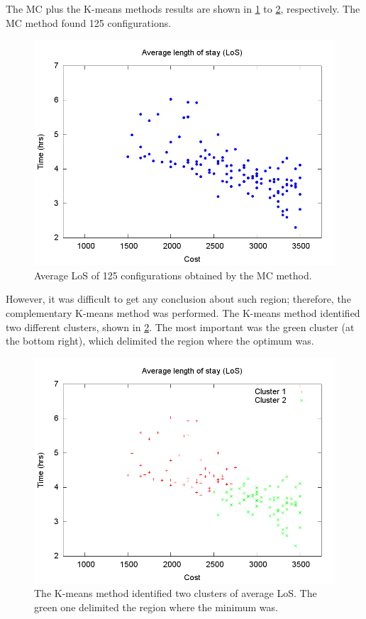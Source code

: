 \documentclass[11pt]{article} %
\begin{document}
The MC plus the K-means methods results are shown in \ref{subfig:mc17-1}
to \ref{subfig:km17-1}, respectively. The MC method found 125 configurations.
\begin{figure}[H]
\noindent \centering{}\includegraphics[width=0.95\columnwidth,height=0.25\paperheight]{figs4/v0/MC/MC-6400-602-100-69-25-125confs-LoS}\caption{Average LoS of 125 configurations obtained by the MC method. \label{subfig:mc17-1}}
\end{figure}
 However, it was difficult to get any conclusion about such region;
therefore, the complementary K-means method was performed. The K-means
method identified two different clusters, shown in \ref{subfig:km17-1}.
The most important was the green cluster (at the bottom right), which
delimited the region where the optimum was.
\begin{figure}[H]
\noindent \centering{}\includegraphics[width=0.95\columnwidth,height=0.25\paperheight]{figs4/v0/MC/K-means-6400-602-100-69-25-125-Cluster1-49_Cluster2-68}\caption{The K-means method identified two clusters of average LoS. The green
one delimited the region where the minimum was.\label{subfig:km17-1}}
\end{figure}
\end{document}
